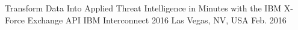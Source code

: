 \begin{cventries}
  \cventry
    {Transform Data Into Applied Threat Intelligence in Minutes with the IBM X-Force Exchange API}
    {IBM Interconnect 2016}
    {Las Vegas, NV, USA}
    {Feb. 2016}
    {
    }
\end{cventries}
